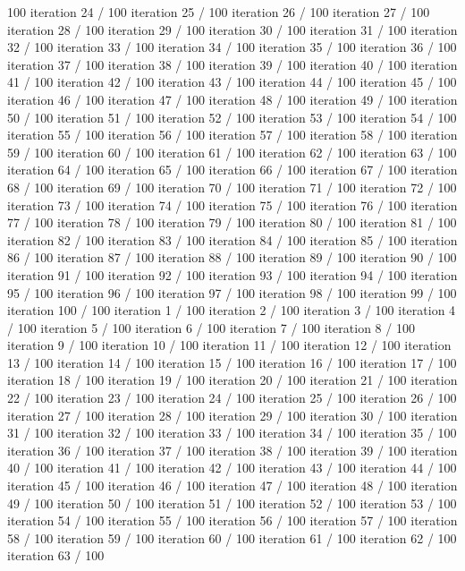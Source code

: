 100 iteration 24 / 100 iteration 25 / 100 iteration 26 / 100 iteration
27 / 100 iteration 28 / 100 iteration 29 / 100 iteration 30 / 100
iteration 31 / 100 iteration 32 / 100 iteration 33 / 100 iteration 34 /
100 iteration 35 / 100 iteration 36 / 100 iteration 37 / 100 iteration
38 / 100 iteration 39 / 100 iteration 40 / 100 iteration 41 / 100
iteration 42 / 100 iteration 43 / 100 iteration 44 / 100 iteration 45 /
100 iteration 46 / 100 iteration 47 / 100 iteration 48 / 100 iteration
49 / 100 iteration 50 / 100 iteration 51 / 100 iteration 52 / 100
iteration 53 / 100 iteration 54 / 100 iteration 55 / 100 iteration 56 /
100 iteration 57 / 100 iteration 58 / 100 iteration 59 / 100 iteration
60 / 100 iteration 61 / 100 iteration 62 / 100 iteration 63 / 100
iteration 64 / 100 iteration 65 / 100 iteration 66 / 100 iteration 67 /
100 iteration 68 / 100 iteration 69 / 100 iteration 70 / 100 iteration
71 / 100 iteration 72 / 100 iteration 73 / 100 iteration 74 / 100
iteration 75 / 100 iteration 76 / 100 iteration 77 / 100 iteration 78 /
100 iteration 79 / 100 iteration 80 / 100 iteration 81 / 100 iteration
82 / 100 iteration 83 / 100 iteration 84 / 100 iteration 85 / 100
iteration 86 / 100 iteration 87 / 100 iteration 88 / 100 iteration 89 /
100 iteration 90 / 100 iteration 91 / 100 iteration 92 / 100 iteration
93 / 100 iteration 94 / 100 iteration 95 / 100 iteration 96 / 100
iteration 97 / 100 iteration 98 / 100 iteration 99 / 100 iteration 100 /
100 iteration 1 / 100 iteration 2 / 100 iteration 3 / 100 iteration 4 /
100 iteration 5 / 100 iteration 6 / 100 iteration 7 / 100 iteration 8 /
100 iteration 9 / 100 iteration 10 / 100 iteration 11 / 100 iteration 12
/ 100 iteration 13 / 100 iteration 14 / 100 iteration 15 / 100 iteration
16 / 100 iteration 17 / 100 iteration 18 / 100 iteration 19 / 100
iteration 20 / 100 iteration 21 / 100 iteration 22 / 100 iteration 23 /
100 iteration 24 / 100 iteration 25 / 100 iteration 26 / 100 iteration
27 / 100 iteration 28 / 100 iteration 29 / 100 iteration 30 / 100
iteration 31 / 100 iteration 32 / 100 iteration 33 / 100 iteration 34 /
100 iteration 35 / 100 iteration 36 / 100 iteration 37 / 100 iteration
38 / 100 iteration 39 / 100 iteration 40 / 100 iteration 41 / 100
iteration 42 / 100 iteration 43 / 100 iteration 44 / 100 iteration 45 /
100 iteration 46 / 100 iteration 47 / 100 iteration 48 / 100 iteration
49 / 100 iteration 50 / 100 iteration 51 / 100 iteration 52 / 100
iteration 53 / 100 iteration 54 / 100 iteration 55 / 100 iteration 56 /
100 iteration 57 / 100 iteration 58 / 100 iteration 59 / 100 iteration
60 / 100 iteration 61 / 100 iteration 62 / 100 iteration 63 / 100
